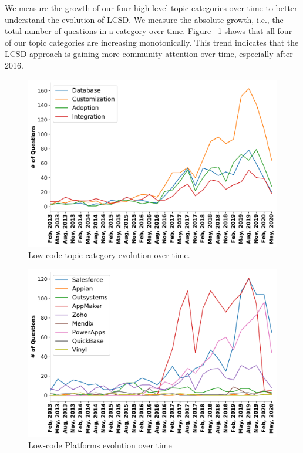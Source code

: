 We measure the growth of our four high-level topic categories over time to better understand the evolution of LCSD. We measure the absolute growth, i.e., the total number of questions in a category over time. Figure ~\ref{fig:trend_questions_per_topic_category} shows that all four of our topic categories are increasing monotonically.
This trend indicates that the LCSD approach is gaining more community attention over time, especially after 2016. 
\begin{figure}[t]
\centering
\includegraphics[scale=0.38]{res/Question_per_higher_category_3M.pdf}
\caption{Low-code topic category evolution over time.}
\label{fig:trend_questions_per_topic_category}
\end{figure}

\begin{figure}[t]
\centering
\includegraphics[scale=0.38]{res/question_per_platform_3M.pdf}
\caption{Low-code Platforms evolution over time}
\label{fig:trend_questions_per_platform}
\end{figure}

